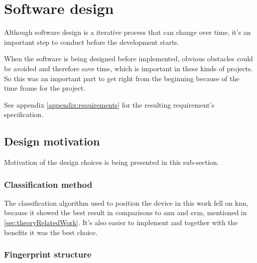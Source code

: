 \section{Software design}\label{sec:methodSoftwareDesign}
Although software design is a iterative process that can change over time, it's an important step to conduct before the development starts. \cite{EngineeringDesignIts1989, ImportanceBusinessProcess2008}

\bigskip

When the software is being designed before implemented, obvious obstacles could be avoided and therefore save time, which is important in these kinds of projects.
So this was an important part to get right from the beginning because of the time frame for the project.

\bigskip

See appendix \ref{appendix:requirements} for the resulting requirement's specification.


\subsection{Design motivation}\label{sec:methodDesignMotivation}
Motivation of the design choices is being presented in this sub-section.


\subsubsection{Classification method}\label{sec:methodSoftwareDesignClassification}
The classification algorithm used to position the device in this work fell on \acrfull{knn}, because it showed the best result in comparisons to \acrlong{ann} and \acrlong{svm}, mentioned in \cref{sec:theoryRelatedWork}.
It's also easier to implement and together with the benefits it was the best choice.


\subsubsection{Fingerprint structure}\label{sec:methodSoftwareDesignFingerprint}


